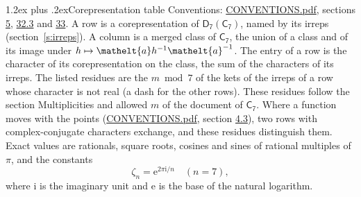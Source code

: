 \documentclass[10pt,a4paper]{article}
\makeatletter
\renewcommand\section{\@startsection{section}{1}{\z@}{-3ex plus -1ex minus -.2ex}%
  {1.2ex plus .2ex}{\normalfont\large\sffamily\bfseries\color{parttitle}}}
\numberwithin{equation}{section}
\newcommand{\eltfont}[1]{{\let\sigma\eltsigma\mathelt{#1}}}
\newcommand{\grp}[1]{\mathsf{#1}}
\newcommand{\elt}[1]{\eltfont{#1}}
\newcommand{\iunit}{\mathrm{i}}
\newcommand{\expe}{\mathrm{e}}
\newcommand{\rootunity}[1]{\zeta_{#1}}
\makeatother
\begin{document}
\section{Corepresentation table}\label{s:character_table}
Conventions: \href{../../CONVENTIONS.pdf}{CONVENTIONS.pdf}, sections \href{../../../rotation/CONVENTIONS.pdf\#conv.5}{5}, \href{../../CONVENTIONS.pdf\#conv.32.3}{32.3} and \href{../../CONVENTIONS.pdf\#conv.33}{33}.
A row is a corepresentation of $\grp{D_{7}}(\grp{C_{7}})$, named by its irreps (section~\ref{s:irreps}). A column is a merged class of $\grp{C_{7}}$, the union of a class and of its image under $h \mapsto \elt{a} h^{-1} \elt{a}^{-1}$. The entry of a row is the character of its corepresentation on the class, the sum of the characters of its irreps.
\leavevmode\label{n:head.parity}The listed residues are the $m \bmod 7$ of the kets of the irreps of a row whose character is not real (a dash for the other rows). These residues follow the section Multiplicities and allowed $m$ of the document of \href{../../../rotation/data/pdf/C7.pdf}{$\grp{C_{7}}$}. Where a function moves with the points (\href{../../CONVENTIONS.pdf}{CONVENTIONS.pdf}, section \href{../../../rotation/CONVENTIONS.pdf\#conv.4.3}{4.3}), two rows with complex-conjugate characters exchange, and these residues distinguish them.
\leavevmode\label{n:constant.root}\label{n:index.root.order}Exact values are rationals, square roots, cosines and sines of rational multiples of $\pi$, and the constants
\begin{equation}\label{e:constants}\rootunity{n} = \expe^{2\pi\iunit/n}\quad(n = 7),\end{equation}
where $\iunit$ is the imaginary unit and $\expe$ is the base of the natural logarithm.
\end{document}
